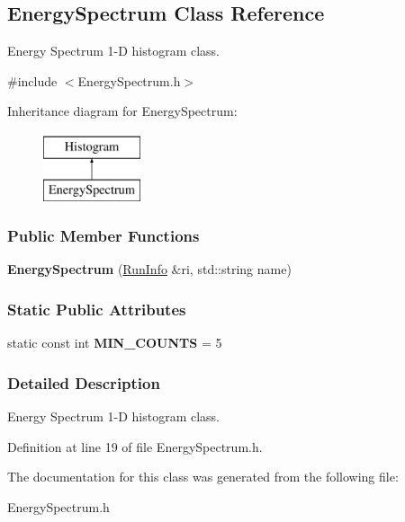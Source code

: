 \hypertarget{classEnergySpectrum}{
\subsection{EnergySpectrum Class Reference}
\label{classEnergySpectrum}
}


Energy Spectrum 1-\/D histogram class.  




{\ttfamily \#include $<$EnergySpectrum.h$>$}

Inheritance diagram for EnergySpectrum:\begin{figure}[H]
\begin{center}
\leavevmode
\includegraphics[height=2.000000cm]{classEnergySpectrum}
\end{center}
\end{figure}
\subsubsection*{Public Member Functions}
\begin{DoxyCompactItemize}
\item 
\hypertarget{classEnergySpectrum_a35aa6153b08658999614f041830be69d}{
{\bfseries EnergySpectrum} (\hyperlink{classRunInfo}{RunInfo} \&ri, std::string name)}
\label{classEnergySpectrum_a35aa6153b08658999614f041830be69d}

\end{DoxyCompactItemize}
\subsubsection*{Static Public Attributes}
\begin{DoxyCompactItemize}
\item 
\hypertarget{classEnergySpectrum_a30a91c5193042bf0d2fe353d358d7ca9}{
static const int {\bfseries MIN\_\-COUNTS} = 5}
\label{classEnergySpectrum_a30a91c5193042bf0d2fe353d358d7ca9}

\end{DoxyCompactItemize}


\subsubsection{Detailed Description}
Energy Spectrum 1-\/D histogram class. 

Definition at line 19 of file EnergySpectrum.h.



The documentation for this class was generated from the following file:\begin{DoxyCompactItemize}
\item 
EnergySpectrum.h\end{DoxyCompactItemize}
